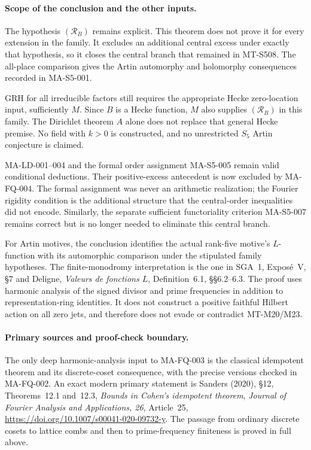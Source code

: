 \paragraph{Scope of the conclusion and the other inputs.}
The hypothesis $(\mathcal R_B)$ remains explicit.
This theorem does not prove it for every extension in the
family.  It excludes an additional central excess under
exactly that hypothesis, so it closes the central branch
that remained in MT-S508.  The all-place comparison gives
the Artin automorphy and holomorphy consequences recorded
in MA-S5-001.

GRH for all irreducible factors still requires the
appropriate Hecke zero-location input, sufficiently $M$.
Since $B$ is a Hecke function, $M$ also supplies
$(\mathcal R_B)$ in this family.  The Dirichlet theorem
$A$ alone does not replace that general Hecke premise.
No field with $k>0$ is constructed, and no unrestricted
$S_5$ Artin conjecture is claimed.

MA-LD-001--004 and the formal order assignment MA-S5-005
remain valid conditional deductions.  Their positive-excess
antecedent is now excluded by MA-FQ-004.  The formal
assignment was never an arithmetic realization; the
Fourier rigidity condition is the additional structure
that the central-order inequalities did not encode.
Similarly, the separate sufficient functoriality criterion
MA-S5-007 remains correct but is no longer needed to
eliminate this central branch.

For Artin motives, the conclusion identifies the actual
rank-five motive's $L$-function with its automorphic
comparison under the stipulated family hypotheses.
The finite-monodromy interpretation is the one in
SGA~1, Expos\'e~V, \S7 and Deligne,
\emph{Valeurs de fonctions $L$}, Definition~6.1,
\S\S6.2--6.3.  The proof uses harmonic analysis of the
signed divisor and prime frequencies in addition to
representation-ring identities.  It does not construct
a positive faithful Hilbert action on all zero jets,
and therefore does not evade or contradict MT-M20/M23.

\paragraph{Primary sources and proof-check boundary.}
The only deep harmonic-analysis input to MA-FQ-003 is
the classical idempotent theorem and its discrete-coset
consequence, with the precise versions checked in
MA-FQ-002.  An exact modern primary statement is
Sanders (2020), \S12, Theorems~12.1 and~12.3,
\emph{Bounds in Cohen's idempotent theorem},
\emph{Journal of Fourier Analysis and Applications, 26},
Article~25,
\url{https://doi.org/10.1007/s00041-020-09732-y}.
The passage from ordinary discrete cosets to lattice
combs and then to prime-frequency finiteness is proved
in full above.

